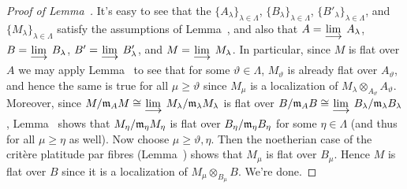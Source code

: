 \documentclass[a4paper,parskip=half,numbers=enddot, DIV=12]{scrreprt}
\renewcommand{\geq}{\geqslant}
\begin{document}
\begin{proof}[Proof of Lemma~]
	It's easy to see that the $\{A_\lambda\}_{\lambda\in \Lambda}$, $\{B_\lambda\}_{\lambda\in \Lambda}$, $\{B'_\lambda\}_{\lambda\in \Lambda}$, and $\{M_\lambda\}_{\lambda\in \Lambda}$ satisfy the assumptions of Lemma~, and also that $A=\colimit A_\lambda$, $B=\colimit B_\lambda$, $B'=\colimit B'_\lambda$, and $M=\colimit M_\lambda$. In particular, since $M$ is flat over $A$ we may apply Lemma~ to see that for some $\vartheta\in\Lambda$, $M_\vartheta$ is already flat over $A_\vartheta$, and hence the same is true for all $\mu\geq \vartheta$ since $M_\mu$ is a localization of $M_\lambda\otimes_{A_\vartheta}A_\vartheta$. Moreover, since $M/\mm_AM\cong \colimit M_\lambda/\mm_\lambda M_\lambda$ is flat over $B/\mm_AB\cong \colimit B_\lambda/\mm_\lambda B_\lambda$, Lemma~ shows that $M_\eta/\mathfrak{m}_\eta M_\eta$ is flat over $B_\eta/\mathfrak{m}_\eta B_\eta$ for some $\eta\in \Lambda$ (and thus for all $\mu\geq \eta$ as well). Now choose $\mu\geq \vartheta,\eta$. Then the noetherian case of the critère platitude par fibres (Lemma~) shows that $M_\mu$ is flat over $B_\mu$. Hence $M$ is flat over $B$ since it is a localization of $M_\mu\otimes_{B_\mu}B$. We're done.
\end{proof}

\printbibliography
\end{document}
